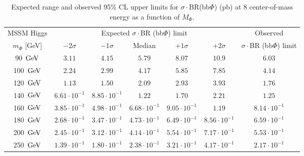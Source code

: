 \clearpage

\begin{table}[!h]
  \begin{center}
    \caption{Expected range and observed 95\% CL upper limits for $\sigma\cdot$BR(bb$\Phi$) (pb) at 8 \TeV center-of-mass energy as a function of $M_{\Phi}$.}
{\small
\begin{tabular}{|c|c|c|c|c|c|c|}
\cline{2-7}
\multicolumn{1}{c}{MSSM Higgs}      & \multicolumn{5}{|c|}{Expected $\sigma\cdot$BR (bb$\Phi$) limit} & Observed \\
\cline{1-6}
  $m_{\Phi}$ [GeV] &$-2\sigma$  &   $-1\sigma$ &        Median &    $+1\sigma$ &  $+2\sigma$ & $\sigma\cdot$BR (bb$\Phi$) limit \\ 
\hline
                90~$\mathrm{GeV}$ &               $3.11$ &               $4.15$ &               $5.79$ &               $8.07$ &               $10.9$ &               $6.03$  \\
\hline
               100~$\mathrm{GeV}$ &               $2.24$ &               $2.99$ &               $4.17$ &               $5.85$ &               $7.85$ &               $4.14$  \\
\hline
               120~$\mathrm{GeV}$ &               $1.13$ &               $1.50$ &               $2.09$ &               $2.93$ &               $3.93$ &               $1.76$  \\
\hline
               140~$\mathrm{GeV}$ &               $6.61 \cdot 10^{-1}$ &               $8.85 \cdot 10^{-1}$ &               $1.22$ &               $1.70$ &               $2.21$ &               $1.25$  \\
\hline
               160~$\mathrm{GeV}$ &               $3.85 \cdot 10^{-1}$ &               $4.98 \cdot 10^{-1}$ &               $6.68 \cdot 10^{-1}$ &               $9.05 \cdot 10^{-1}$ &               $1.19$ &               $8.14 \cdot 10^{-1}$  \\
\hline
               180~$\mathrm{GeV}$ &               $2.68 \cdot 10^{-1}$ &               $3.47 \cdot 10^{-1}$ &               $4.73 \cdot 10^{-1}$ &               $6.49 \cdot 10^{-1}$ &               $8.56 \cdot 10^{-1}$ &               $6.59 \cdot 10^{-1}$  \\
\hline
               200~$\mathrm{GeV}$ &               $2.45 \cdot 10^{-1}$ &               $3.12 \cdot 10^{-1}$ &               $4.14 \cdot 10^{-1}$ &               $5.54 \cdot 10^{-1}$ &               $7.17 \cdot 10^{-1}$ &               $5.53 \cdot 10^{-1}$  \\
\hline
               250~$\mathrm{GeV}$ &               $1.39 \cdot 10^{-1}$ &               $1.80 \cdot 10^{-1}$ &               $2.38 \cdot 10^{-1}$ &               $3.21 \cdot 10^{-1}$ &               $4.17 \cdot 10^{-1}$ &               $2.17 \cdot 10^{-1}$  \\

\end{tabular}}
\end{center}
\end{table}
